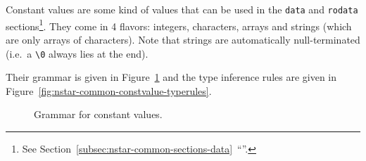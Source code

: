 Constant values are some kind of values that can be used in the \texttt{data} and \texttt{rodata} sections\footnote{See Section~\ref{subsec:nstar-common-sections-data}~``''.}.
They come in 4 flavors: integers, characters, arrays and strings (which are only arrays of characters).
Note that strings are automatically null-terminated (i.e.\ a \texttt{\textbackslash 0} always lies at the end).

Their grammar is given in Figure~\ref{fig:nstar-common-constvalue-grammar} and the type inference rules are given in Figure~\ref{fig:nstar-common-constvalue-typerules}.

\begin{figure}[htb]
  \centering


  \caption{Grammar for constant values.}
  \label{fig:nstar-common-constvalue-grammar}
\end{figure}

